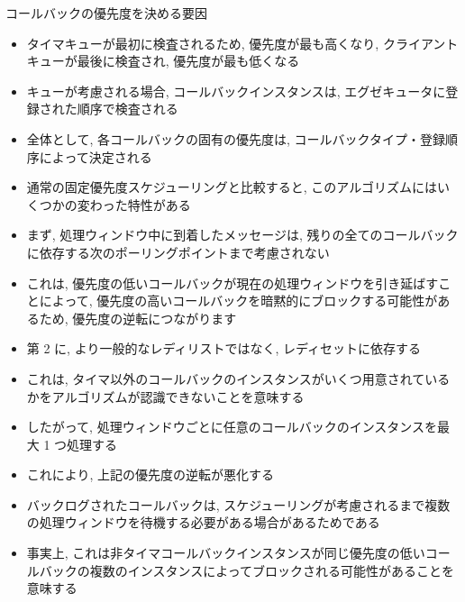 \begin{frame}{コールバックの優先度を決める要因}
    \begin{itemize}
        \item タイマキューが最初に検査されるため, 優先度が最も高くなり, クライアントキューが最後に検査され, 優先度が最も低くなる
        \item キューが考慮される場合, コールバックインスタンスは, エグゼキュータに登録された順序で検査される
        \item 全体として, 各コールバックの固有の優先度は, コールバックタイプ・登録順序によって決定される
    \end{itemize}
\end{frame}

\begin{frame}{}
    \begin{itemize}
        \item 通常の固定優先度スケジューリングと比較すると, このアルゴリズムにはいくつかの変わった特性がある
        \item まず, 処理ウィンドウ中に到着したメッセージは, 残りの全てのコールバックに依存する次のポーリングポイントまで考慮されない
        \item これは, 優先度の低いコールバックが現在の処理ウィンドウを引き延ばすことによって, 優先度の高いコールバックを暗黙的にブロックする可能性があるため, 優先度の逆転につながります
    \end{itemize}
\end{frame}

\begin{frame}{}
    \begin{itemize}
        \item 第 2 に, より一般的なレディリストではなく, レディセットに依存する
        \item これは, タイマ以外のコールバックのインスタンスがいくつ用意されているかをアルゴリズムが認識できないことを意味する
        \item したがって, 処理ウィンドウごとに任意のコールバックのインスタンスを最大 1 つ処理する
        \item これにより, 上記の優先度の逆転が悪化する
        \item バックログされたコールバックは, スケジューリングが考慮されるまで複数の処理ウィンドウを待機する必要がある場合があるためである
        \item 事実上, これは非タイマコールバックインスタンスが同じ優先度の低いコールバックの複数のインスタンスによってブロックされる可能性があることを意味する
    \end{itemize}
\end{frame}
